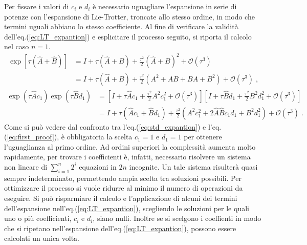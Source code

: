 \documentclass[12pt]{report}
\begin{document}
Per fissare i valori di $c_{i}$ e $d_{i}$ è necessario uguagliare l'espansione in serie di potenze con l'espansione di Lie-Trotter, troncate allo stesso ordine, in modo che termini uguali abbiano lo stesso coefficiente.
Al fine di verificare la validità dell'eq.(\ref{eq:LT_expantion}) e esplicitare il processo seguito, si riporta il calcolo nel caso $n=1$.
\begin{equation}
    \begin{split}
        \exp \left[\tau (\hat {A} + \hat{B})\right] 
        & = I + \tau(\hat{A} + B) + \frac{\tau^{2}}{2} (\hat{A} + B)^2 + \mathcal{O}(\tau^{3})  \\
        & = I + \tau(\hat{A} + B) + \frac{\tau^{2}}{2} (A^2 + AB + BA + B^2) + \mathcal{O}(\tau^{3}) \; \text{,}
    \end{split}
    \label{eq:std_expantion}
\end{equation}
\begin{equation}
    \begin{split}
        \exp \left(\tau \hat{A} c_{1} \right)  \exp \left(\tau \hat{B} d_{1} \right) 
        & = \left[ I + \tau \hat{A} c_{1}  + \frac{\tau^{2}}{2} A^2 c_{1}^2 + \mathcal{O}(\tau^{3}) \right] \left[  I + \tau \hat{B} d_{1} + \frac{\tau^{2}}{2} B^2 d_{1}^2+ \mathcal{O}(\tau^{3}) \right] \\
        & = I + \tau (\hat{A} c_{1} + \hat{B} d_{1} ) + \frac{\tau^{2}}{2} (A^2 c_{1}^2 + 2  \hat{A} \hat{B} c_{1}d_{1} + B^2 d_{1}^2) + \mathcal{O}(\tau^{3}) \; \text{.}
    \end{split}
    \label{eq:first_proof}
\end{equation}
Come si può vedere dal confronto tra l'eq.(\ref{eq:std_expantion}) e l'eq.(\ref{eq:first_proof}), è obbligatoria la scelta $c_{1} = 1$ e $d_{1} = 1$ per ottenere l'uguaglianza al primo ordine.
Ad ordini superiori la complessità aumenta molto rapidamente, per trovare i coefficienti è, infatti, necessario risolvere un sistema non lineare di $\sum_{i=1}^{n} 2^{i} $ equazioni in $2n$ incognite. Un tale sistema risulterà quasi sempre indeterminato, permettendo ampia scelta tra soluzioni possibili. 
Per ottimizzare il processo si vuole ridurre al minimo il numero di operazioni da eseguire. Si può risparmiare il calcolo e l'applicazione di alcuni dei termini dell'espansione nell'eq.(\ref{eq:LT_expantion}), scegliendo le soluzioni per le quali uno o più coefficienti, $c_i$ e $d_i$, siano nulli. Inoltre se si scelgono i coeffienti in modo che si ripetano nell'espansione dell'eq.(\ref{eq:LT_expantion}), possono essere calcolati un unica volta.  
\end{document}
